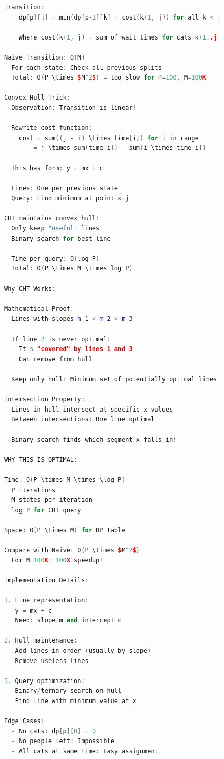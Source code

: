 \documentclass[11pt,a4paper,oneside]{book}
\begin{document}
\begin{lstlisting}[language=C++, caption=Convex Hull Trick Solutions - NEW PROBLEMS]
  Transition:
    dp[p][j] = min(dp[p-1][k] + cost(k+1, j)) for all k < j
    
    Where cost(k+1, j) = sum of wait times for cats k+1..j

Naive Transition: O(M)
  For each state: Check all previous splits
  Total: O(P \times $M^2$) = too slow for P=100, M=100K

Convex Hull Trick:
  Observation: Transition is linear!
    
  Rewrite cost function:
    cost = sum((j - i) \times time[i]) for i in range
        = j \times sum(time[i]) - sum(i \times time[i])
  
  This has form: y = mx + c
  
  Lines: One per previous state
  Query: Find minimum at point x=j

CHT maintains convex hull:
  Only keep "useful" lines
  Binary search for best line
  
  Time per query: O(log P)
  Total: O(P \times M \times log P)

Why CHT Works:

Mathematical Proof:
  Lines with slopes m_1 < m_2 < m_3
  
  If line 2 is never optimal:
    It's "covered" by lines 1 and 3
    Can remove from hull
  
  Keep only hull: Minimum set of potentially optimal lines

Intersection Property:
  Lines in hull intersect at specific x-values
  Between intersections: One line optimal
  
  Binary search finds which segment x falls in!

WHY THIS IS OPTIMAL:

Time: O(P \times M \times \log P)
  P iterations
  M states per iteration
  log P for CHT query

Space: O(P \times M) for DP table

Compare with Naive: O(P \times $M^2$)
  For M=100K: 100X speedup!

Implementation Details:

1. Line representation:
   y = mx + c
   Need: slope m and intercept c

2. Hull maintenance:
   Add lines in order (usually by slope)
   Remove useless lines

3. Query optimization:
   Binary/ternary search on hull
   Find line with minimum value at x

Edge Cases:
  - No cats: dp[p][0] = 0
  - No people left: Impossible
  - All cats at same time: Easy assignment


\end{lstlisting}
\end{document}
